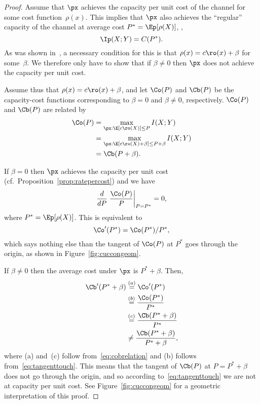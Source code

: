 \begin{proof}
  Assume that $\px$ achieves the capacity per unit cost of the channel for some
  cost function~$\rho(x)$. This implies that $\px$ also achieves the ``regular''
  capacity of the channel at average cost $P^* = \Ep[\rho(X)]$, \ie, 
  \[ \Ip(X;Y) = C(P^*). \]
  As was shown in~\cite{GastparRV2003}, a necessary condition for this is that
  $\rho(x) = c\ro(x) + \beta$ for some~$\beta$. We therefore only have to show
  that if $\beta \ne 0$ then $\px$ does not achieve the capacity per unit cost. 

  Assume thus that $\rho(x) = c\ro(x) + \beta$, and let $\Co(P)$ and $\Cb(P)$ be
  the capacity-cost functions corresponding to $\beta = 0$ and $\beta \ne 0$,
  respectively. $\Co(P)$ and $\Cb(P)$ are related by
  \begin{align}
    \Co(P) &= \max_{\px: \E[c\ro(X)] \le P} I(X;Y) \nonumber \\
    &= \max_{\px: \E[c\ro(X) + \beta] \le P + \beta} I(X;Y) \nonumber \\
    &= \Cb(P + \beta). \label{eq:cobrelation}
  \end{align}

  If $\beta = 0$ then $\px$ achieves the capacity per unit cost (cf.\
  Proposition~\ref{prop:ratepercost}) and we have
  \begin{equation*}
    \frac{d}{dP} \left. \frac{\Co(P)}{P} \right|_{P=P^*} = 0,
  \end{equation*}
  where $P^* = \Ep[\rho(X)]$. This is equivalent to
  \begin{equation}
    \label{eq:tangenttouch}
    \Co'(P^*) = \Co(P^*)/P^*,
  \end{equation}
  which says nothing else than the tangent of $\Co(P)$ at $P^*$
  goes through the origin, as shown in Figure~\ref{fig:cuccongeom}.

  If $\beta \ne 0$ then the average cost under $\px$ is $P^* + \beta$. Then,
  \begin{align*}
    \Cb'(P^* + \beta) &\stackrel{(a)}{=} \Co'(P^*) \\
    &\stackrel{(b)}{=} \frac{\Co(P^*)}{P^*} \\
    &\stackrel{(c)}{=} \frac{\Cb(P^*+\beta)}{P^*} \\
    &\ne \frac{\Cb(P^* + \beta)}{P^* + \beta},
  \end{align*}
  where (a) and~(c) follow from~\eqref{eq:cobrelation} and (b) follows
  from~\eqref{eq:tangenttouch}.  This means that the tangent of $\Cb(P)$ at
  $P = P^* + \beta$ does not go through the origin, and so according
  to~\eqref{eq:tangenttouch} we are not at capacity per unit cost.
  See Figure~\ref{fig:cuccongeom} for a geometric interpretation of this proof.
\end{proof}

